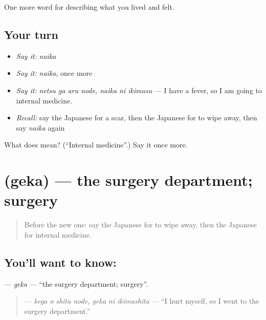 \begin{grammarlens}[title={What you've built}]
One more word for describing what you lived and felt.
\end{grammarlens}

\subsection*{Your turn}
\begin{itemize}
\raggedright
  \item \emph{Say it:} \emph{naika}
  \item \emph{Say it:} \emph{naika}, once more
  \item \emph{Say it:} \emph{netsu ga aru node, naika ni ikimasu} — I have a fever, so I am going to internal medicine.
  \item \emph{Recall:} say the Japanese for a scar, then the Japanese for to wipe away, then say \emph{naika} again
\end{itemize}

\begin{tcolorbox}[breakable,colback=teal!4,colframe=teal!35!black,title={Before you move on}]
What does  mean? (\textquotedblleft{}Internal medicine\textquotedblright{}.) Say it once more.
\end{tcolorbox}
\section[\texorpdfstring{\ja{げか} (geka)}{げか (geka)}]{ (geka) — the surgery department; surgery}

\label{lesson:JA-C450-geka}



\begin{quote}
Before the new one: say the Japanese for to wipe away, then the Japanese for internal medicine.
\end{quote}

\subsection*{You'll want to know: }
\textbf{} — \emph{geka} — \textquotedblleft{}the surgery department; surgery\textquotedblright{}.

\begin{quote}
\textbf{  } — \emph{kega o shita node, geka ni ikimashita} — \textquotedblleft{}I hurt myself, so I went to the surgery department.\textquotedblright{}
\end{quote}

